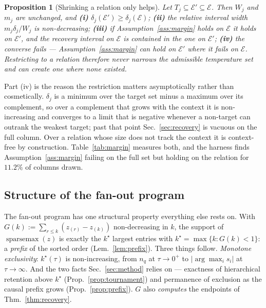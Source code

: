 \documentclass{article}
\newtheorem{proposition}{Proposition}
\begin{document}
\begin{proposition}[Shrinking a relation only helps]
\label{prop:scopemono}
Let $T_j\subseteq\mathcal{E}'\subseteq\mathcal{E}$. Then $W_j$ and $m_j$ are unchanged, and
\textbf{(i)} $\delta_j(\mathcal{E}')\ge\delta_j(\mathcal{E})$;
\textbf{(ii)} the relative interval width $m_j\delta_j/W_j$ is non-decreasing;
\textbf{(iii)} if Assumption~\ref{ass:margin} holds on $\mathcal{E}$ it holds on $\mathcal{E}'$,
and the recovery interval on $\mathcal{E}$ is \emph{contained in} the one on $\mathcal{E}'$;
\textbf{(iv)} the converse fails --- Assumption~\ref{ass:margin} can hold on $\mathcal{E}'$ where
it fails on $\mathcal{E}$.
Restricting to a relation therefore never narrows the admissible temperature set and can create
one where none existed.
\end{proposition}

\noindent Part (iv) is the reason the restriction matters asymptotically rather than cosmetically.
$\delta_j$ is a minimum over the target set minus a maximum over its complement, so over a
complement that grows with the context it is non-increasing and converges to a limit that is
negative whenever a non-target can outrank the weakest target; past that point
Sec.~\ref{sec:recovery} is vacuous on the full column. Over a relation whose size does not track
the context it is context-free by construction. Table~\ref{tab:margin} measures both, and the
harness finds Assumption~\ref{ass:margin} failing on the full set but holding on the relation for
$11.2\%$ of columns drawn.

\subsection{Structure of the fan-out program}

The fan-out program has one structural property everything else rests on. With
$G(k):=\sum_{r\le k}(z_{(r)}-z_{(k)})$ non-decreasing in $k$, the support of
$\operatorname{sparsemax}(z)$ is exactly the $k^\star$ largest entries with
$k^\star=\max\{k:G(k)<1\}$: a \emph{prefix} of the sorted order (Lem.~\ref{lem:prefix}). Three
things follow. \emph{Monotone exclusivity}: $k^\star(\tau)$ is non-increasing, from $n_q$ at
$\tau\to0^+$ to $|\arg\max_i s_i|$ at $\tau\to\infty$. And the two facts Sec.~\ref{sec:method}
relies on --- exactness of hierarchical retention above $k^\star$
(Prop.~\ref{prop:tournament}) and permanence of exclusion as the causal prefix grows
(Prop.~\ref{prop:prefix}). $G$ also \emph{computes} the endpoints of Thm.~\ref{thm:recovery}.
\end{document}
